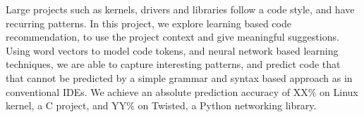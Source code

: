 Large projects such as kernels, drivers and libraries follow a code
style, and have recurring patterns. In this project, we explore learning based
code recommendation, to use the project context and give meaningful
suggestions.
Using word vectors to model code tokens, and neural network based learning
techniques, we are able to capture interesting patterns, and predict code that
that cannot be predicted by a simple grammar and syntax based approach as in
conventional IDEs.
We achieve an absolute prediction accuracy of XX\% on Linux kernel, a C
project, and YY\% on Twisted, a Python networking library.
